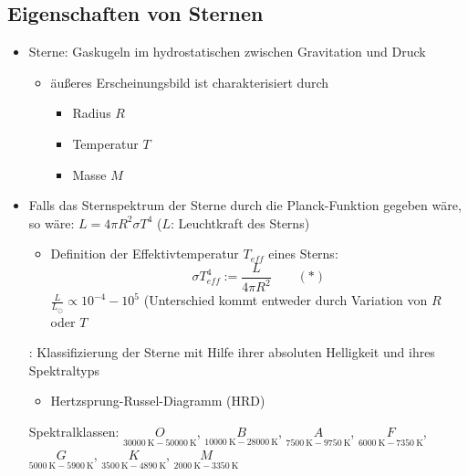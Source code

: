 \subsection{Eigenschaften von Sternen}
\begin{itemize}
	\item Sterne: Gaskugeln im hydrostatischen zwischen Gravitation und Druck
		\begin{itemize}
			\item äußeres Erscheinungsbild ist charakterisiert durch
				\begin{itemize}[label={}]
					\item Radius $R$
					\item Temperatur $T$
					\item Masse $M$
				\end{itemize}
		\end{itemize}
	\item Falls das Sternspektrum der Sterne durch die Planck-Funktion gegeben wäre, so wäre: $L=4\pi R^2\sigma T^4$ ($L$: Leuchtkraft des Sterns)
		\begin{itemize}
			\item Definition der Effektivtemperatur $T_{eff}$ eines Sterns:
				\begin{equation*}
					\sigma T_{eff}^4:=\frac{L}{4\pi R^2}\qquad (\ast)
				\end{equation*}
				$\frac{L}{L_\odot}\propto 10^{-4}-10^{5}$ (Unterschied kommt entweder durch Variation von $R$ oder $T$
		\end{itemize}
	\item[\underline{\smash{Idee}}:] Klassifizierung der Sterne mit Hilfe ihrer absoluten Helligkeit und ihres Spektraltyps
		\begin{itemize}
			\item Hertzsprung-Russel-Diagramm (HRD)
		\end{itemize}
		\begin{figure}[H]
		\end{figure}
		Spektralklassen: $\underset{\SI{30000}{\K}-\SI{50000}{\K}}{O}$, $\underset{\SI{10000}{\K}-\SI{28000}{\K}}{B}$, $\underset{\SI{7500}{\K}-\SI{9750}{\K}}{A}$, $\underset{\SI{6000}{\K}-\SI{7350}{\K}}{F}$, $\underset{\SI{5000}{\K}-\SI{5900}{\K}}{G}$, $\underset{\SI{3500}{\K}-\SI{4890}{\K}}{K}$, $\underset{\SI{2000}{\K}-\SI{3350}{\K}}{M}$

\end{itemize}
